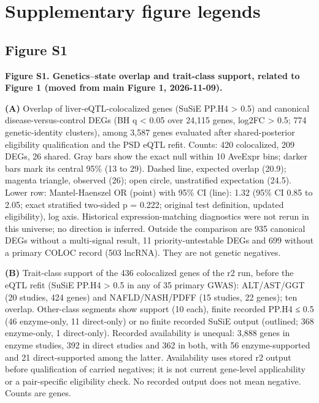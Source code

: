 \section*{Supplementary figure legends}



\subsection{Figure S1}\label{figure-s1}

\textbf{Figure S1. Genetics--state overlap and trait-class support, related to Figure 1 (moved from main Figure 1, 2026-11-09).}

\textbf{(A)} Overlap of liver-eQTL-colocalized genes (SuSiE PP.H4 \textgreater{} 0.5) and canonical disease-versus-control DEGs (BH q \textless{} 0.05 over 24,115 genes, \textbar log2FC\textbar{} \textgreater{} 0.5; 774 genetic-identity clusters), among 3,587 genes evaluated after shared-posterior eligibility qualification and the PSD eQTL refit. Counts: 420 colocalized, 209 DEGs, 26 shared. Gray bars show the exact null within 10 AveExpr bins; darker bars mark its central 95\% (13 to 29). Dashed line, expected overlap (20.9); magenta triangle, observed (26); open circle, unstratified expectation (24.5). Lower row: Mantel-Haenszel OR (point) with 95\% CI (line): 1.32 (95\% CI 0.85 to 2.05; exact stratified two-sided p = 0.222; original test definition, updated eligibility), log axis. Historical expression-matching diagnostics were not rerun in this universe; no direction is inferred. Outside the comparison are 935 canonical DEGs without a multi-signal result, 11 priority-untestable DEGs and 699 without a primary COLOC record (503 lncRNA). They are not genetic negatives.

\textbf{(B)} Trait-class support of the 436 colocalized genes of the r2 run, before the eQTL refit (SuSiE PP.H4 \textgreater{} 0.5 in any of 35 primary GWAS): ALT/AST/GGT (20 studies, 424 genes) and NAFLD/NASH/PDFF (15 studies, 22 genes); ten overlap. Other-class segments show support (10 each), finite recorded PP.H4 ≤ 0.5 (46 enzyme-only, 11 direct-only) or no finite recorded SuSiE output (outlined; 368 enzyme-only, 1 direct-only). Recorded availability is unequal: 3,888 genes in enzyme studies, 392 in direct studies and 362 in both, with 56 enzyme-supported and 21 direct-supported among the latter. Availability uses stored r2 output before qualification of carried negatives; it is not current gene-level applicability or a pair-specific eligibility check. No recorded output does not mean negative. Counts are genes.

